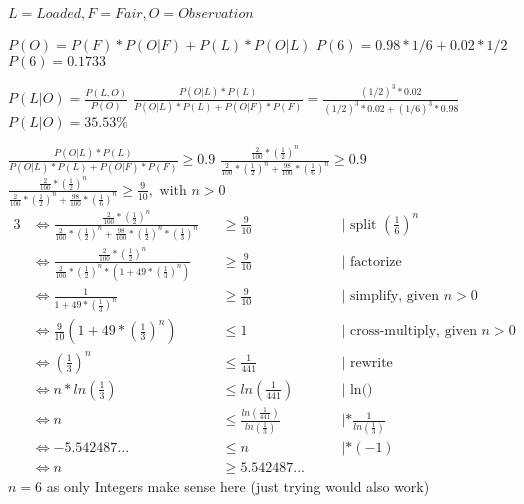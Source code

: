 $L = Loaded, F = Fair, O = Observation$

$P(O) = P(F)* P(O|F)+ P(L) * P(O|L)$
$P(6) = 0.98*1/6 + 0.02*1/2$
$P(6) = 0.1733$


$P(L|O) = \frac{P(L,O)}{P(O)}$
$\frac{P(O|L)*P(L)}{P(O|L)*P(L) + P(O|F)*P(F)} = \frac{(1/2)^3*0.02}{(1/2)^3*0.02 + (1/6)^3*0.98}$
$P(L|O) = 35.53\%$


$\frac{P(O|L)*P(L)}{P(O|L)*P(L) + P(O|F)*P(F)} \geq 0.9$
$\frac{\frac{2}{100}*(\frac{1}{2})^n}{\frac{2}{100}*(\frac{1}{2})^n + \frac{98}{100}*(\frac{1}{6})^n} \geq 0.9$
$\frac{\frac{2}{100}*(\frac{1}{2})^n}{\frac{2}{100}*(\frac{1}{2})^n + \frac{98}{100}*(\frac{1}{6})^n} \geq \frac{9}{10}, \text{ with } n > 0$
\begin{alignat}{3}
&\iff \frac{\frac{2}{100}*(\frac{1}{2})^n}{\frac{2}{100}*(\frac{1}{2})^n + \frac{98}{100}*(\frac{1}{2})^n * (\frac{1}{3})^n} &&\geq \frac{9}{10}  &&\quad| \text{ split } (\frac{1}{6})^n\\
&\iff \frac{\frac{2}{100}*(\frac{1}{2})^n}{\frac{2}{100}*(\frac{1}{2})^n * (1 + 49 * (\frac{1}{3})^n)} &&\geq \frac{9}{10}  &&\quad| \text{ factorize}\\
&\iff \frac{1}{1 + 49 * (\frac{1}{3})^n} &&\geq \frac{9}{10} &&\quad| \text{ simplify, given } n > 0\\
&\iff \frac{9}{10} (1 + 49 * (\frac{1}{3})^n) &&\leq 1  &&\quad| \text{ cross-multiply, given } n > 0\\
&\iff (\frac{1}{3})^n &&\leq \frac{1}{441} &&\quad| \text{ rewrite }\\
&\iff n * ln(\frac{1}{3}) &&\leq ln(\frac{1}{441}) &&\quad| \text{ ln() }\\
&\iff n &&\leq \frac{ln(\frac{1}{441})}{ln(\frac{1}{3})} &&\quad| *\frac{1}{ln(\frac{1}{3})} \\
&\iff -5.542487... &&\leq n &&\quad| * (-1)\\
&\iff n &&\geq 5.542487...
\end{alignat}
$n = 6$ as only Integers make sense here (just trying would also work)
